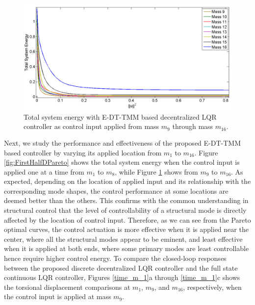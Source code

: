 \documentclass[11pt]{ucthesis}
\begin{document}
\begin{figure}[h]
\centering
\includegraphics[width=1\linewidth]{Figures/SecondHalfPareto.png}
\caption{Total system energy with E-DT-TMM based decentralized LQR controller as control input applied from mass $m_9$ through mass $m_{16}$. }
\label{fig:SecHalfDPareto}
\end{figure}

Next, we study the performance and effectiveness of the proposed E-DT-TMM based controller by varying its applied location from $m_1$ to $m_{16}$. Figure \ref{fig:FirstHalfDPareto} shows the total system energy when the control input is applied one at a time from $m_1$ to $m_8$, while Figure \ref{fig:SecHalfDPareto} shows from $m_9$ to $m_{16}$. As expected, depending on the location of applied input and its relationship with the corresponding mode shapes, the control performance at some locations are deemed better than the others. This confirms with the common understanding in structural control that the level of controllability of a structural mode is directly affected by the location of control input. Therefore, as we can see from the Pareto optimal curves, the control actuation is more effective when it is applied near the center, where all the structural modes appear to be eminent, and least effective when it is applied at both ends, where some primary modes are least controllable hence require higher control energy. To compare the closed-loop responses between the proposed discrete decentralized LQR controller and the full state continuous LQR controller, Figures \ref{time_m_1}a through \ref{time_m_1}c shows the torsional displacement comparisons at $m_1$, $m_9$, and $m_{16}$, respectively, when the control input is applied at mass $m_9$.
\end{document}
